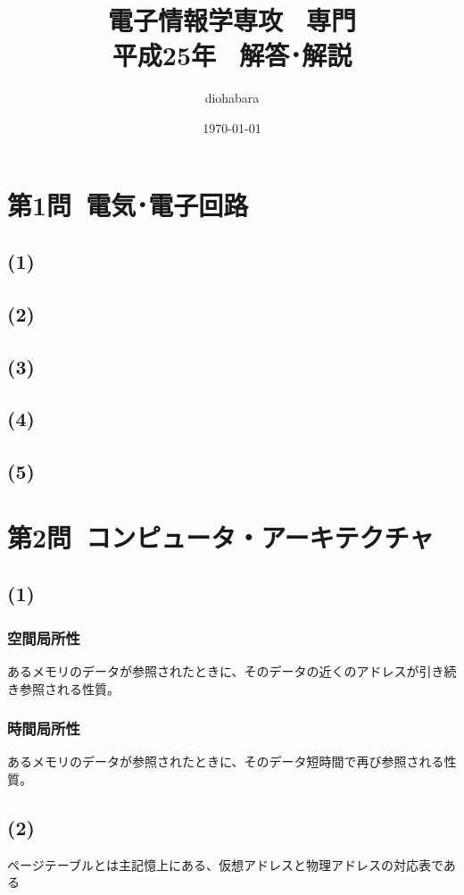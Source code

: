 \documentclass[a4paper,12pt,xelatex,ja=standard]{bxjsarticle}
\title{電子情報学専攻 \, 専門 \\ 平成25年 \, 解答･解説}
\author{diohabara}
\date{\today}
\begin{document}
\maketitle

\section*{第1問\ 電気･電子回路}
  \subsection*{(1)}
  \subsection*{(2)}
  \subsection*{(3)}
  \subsection*{(4)}
  \subsection*{(5)}

\section*{第2問\ コンピュータ・アーキテクチャ}
  \subsection*{(1)}
    \subsubsection*{空間局所性}
    あるメモリのデータが参照されたときに、そのデータの近くのアドレスが引き続き参照される性質。
    \subsubsection*{時間局所性}
    あるメモリのデータが参照されたときに、そのデータ短時間で再び参照される性質。

  \subsection*{(2)}
  ページテーブルとは主記憶上にある、仮想アドレスと物理アドレスの対応表である
\end{document}
